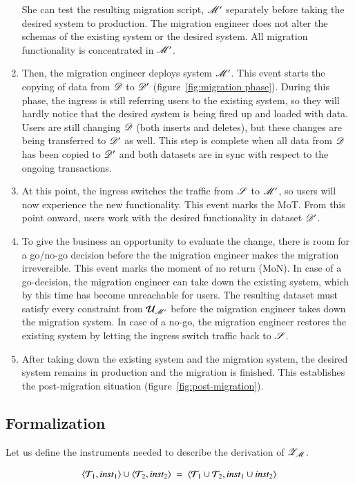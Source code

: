 \documentclass{elsarticle}
\begin{document}
\begin{enumerate}
         She can test the resulting migration script, $\mathscr{M}'$ separately before taking the desired system to production.
         The migration engineer does not alter the schemas of the existing system or the desired system.
         All migration functionality is concentrated in $\mathscr{M}'$.
   \item Then, the migration engineer deploys system $\mathscr{M}'$.
         This event starts the copying of data from $\mathscr{D}$ to $\mathscr{D}'$ (figure~\ref{fig:migration phase}).
         During this phase, the ingress is still referring users to the existing system,
         so they will hardly notice that the desired system is being fired up and loaded with data.
         Users are still changing $\mathscr{D}$ (both inserts and deletes),
         but these changes are being transferred to $\mathscr{D}'$ as well.
         This step is complete when all data from $\mathscr{D}$ has been copied to $\mathscr{D}'$ and
         both datasets are in sync with respect to the ongoing transactions.
   \item At this point, the ingress switches the traffic from $\mathscr{S}$ to $\mathscr{M}'$,
         so users will now experience the new functionality.
         This event marks the MoT.
         From this point onward, users work with the desired functionality in dataset $\mathscr{D}'$.
   \item To give the business an opportunity to evaluate the change,
         there is room for a go/no-go decision before the the migration engineer makes the migration irreversible.
         This event marks the moment of no return (MoN).
         In case of a go-decision, the migration engineer can take down the existing system, which by this time has become unreachable for users.
         The resulting dataset must satisfy every constraint from $\mathcal{U}_{\mathscr{M}'}$ before the migration engineer takes down the migration system.
         In case of a no-go, the migration engineer restores the existing system by letting the ingress switch traffic back to $\mathscr{S}$.
   \item After taking down the existing system and the migration system, the desired system remains in production and the migration is finished.
         This establishes the post-migration situation (figure~\ref{fig:post-migration}).
\end{enumerate}

\subsection{Formalization}
   Let us define the instruments needed to describe the derivation of $\mathscr{Z}_{\mathscr{M}}$.
\begin{definition}
\label{def:graph_union_wellTyped_if_parts_wellTyped}
    \[\pair{\triples_1}{\inst_1}\cup\pair{\triples_2}{\inst_2}\ =\ \pair{\triples_1\cup\triples_2}{\inst_1\cup\inst_2}\]
\end{definition}
\end{document}
